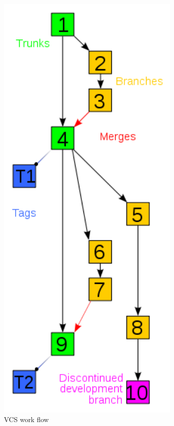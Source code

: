 \documentclass[11pt,ignorenonframetext,]{beamer}
\begin{document}
\begin{frame}
\begin{columns}
  \begin{column}{0.3\textwidth}
 \begin{figure}[htbp]
\centering
\includegraphics[width=0.8\textwidth]{figures/vcsflow.png}
\caption{VCS work flow}
\end{figure}
  \end{column}
\end{columns}
\bigskip

\end{frame}
\end{document}
